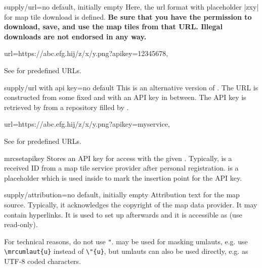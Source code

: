 \clearpage
\begin{docMrcKey}{supply/url}{=}{no default, initially empty}
  Here, the url format with placeholder |{z}{x}{y}| for map tile download is defined.
  \textbf{Be sure that you have the permission to download, save, and use
  the map tiles from that URL. Illegal downloads are not endorsed in any
  way.}
  \begin{dispListing}
    url={https://abc.efg.hij/{z}/{x}/{y}.png?apikey=12345678},
  \end{dispListing}
  See  for predefined URLs.
\end{docMrcKey}


\begin{docMrcKey}{supply/url with api key}{=}{no default}
  This is an alternative version of .
  The URL is constructed from some fixed  and  with
  an API key in between. The API key is retrieved by  from a
  repository filled by .
  \begin{dispListing}
    url={https://abc.efg.hij/{z}/{x}/{y}.png?apikey=}{myservice}{},
  \end{dispListing}
  See  for predefined URLs.
\end{docMrcKey}


\begin{docCommand}{mrcsetapikey}{}
  Stores an API key  for access with the given .
  Typically,  is a received ID from a map tile service provider
  after personal registration.  is a placeholder which is used
  inside  to mark the insertion
  point for the API key.
  \begin{dispListing}
  \end{dispListing}
\end{docCommand}



\begin{docMrcKey}{supply/attribution}{=}{no default, initially empty}
  Attribution text for the map source. Typically, it acknowledges the copyright
  of the map data provider. It may contain hyperlinks.
  It is used to set up  afterwards
  and it is accessible as  (use read-only).\par
  For technical reasons, do not use \verb+"+. 
  may be used for masking umlauts, e.g. use \verb+\mrcumlaut{u}+ instead of
  \verb+\"{u}+, but umlauts can also be used directly, e.g. as UTF-8 coded characters.
\end{docMrcKey}


